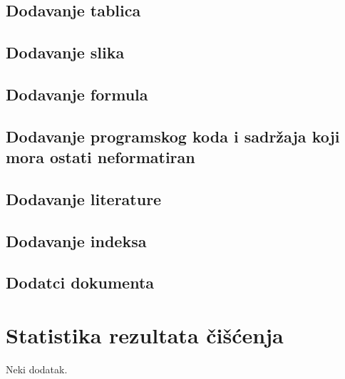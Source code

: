 \documentclass{zavrsni}
\begin{document}
\section{Dodavanje tablica}

\section{Dodavanje slika}

\section{Dodavanje formula}

\section{Dodavanje programskog koda i sadržaja koji mora ostati neformatiran}

\section{Dodavanje literature}

\section{Dodavanje indeksa}

\section{Dodatci dokumenta }




\appendix
\chapter{Statistika rezultata čišćenja}
Neki dodatak.
\end{document}
